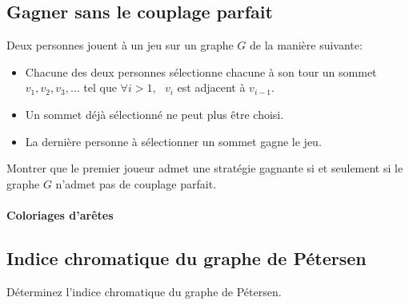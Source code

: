 \subsection{Gagner sans le couplage parfait}
Deux personnes jouent à un jeu sur un graphe $G$ de la manière suivante:

\begin{itemize}
  \item Chacune des deux personnes sélectionne chacune à son tour un sommet $v_1, v_2, v_3, …$ tel que $\forall i > 1, \ \ \ v_i$ est adjacent à $v_{i-1}$.
  \item Un sommet déjà sélectionné ne peut plus être choisi.
  \item La dernière personne à sélectionner un sommet gagne le jeu.
\end{itemize}

Montrer que le premier joueur admet une stratégie gagnante si et seulement si le graphe $G$ n'admet pas de couplage parfait.

\paragraph{Coloriages d'arêtes}

\subsection{Indice chromatique du graphe de Pétersen}
Déterminez l'indice chromatique du graphe de Pétersen.



